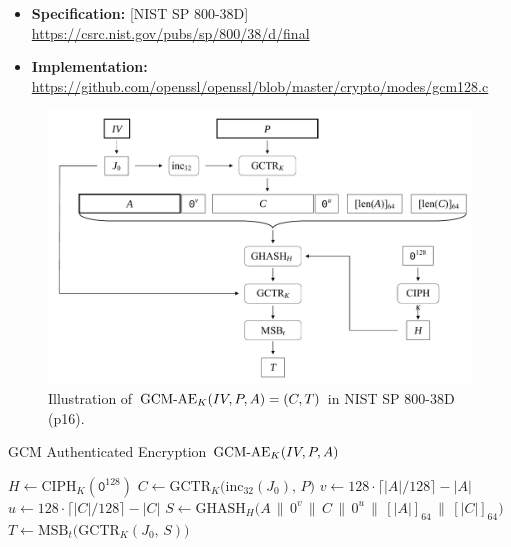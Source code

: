 \begin{itemize}
	\item \textbf{Specification:} [NIST SP 800-38D] \\
	\url{https://csrc.nist.gov/pubs/sp/800/38/d/final}
	\item \textbf{Implementation:} \\
	\url{https://github.com/openssl/openssl/blob/master/crypto/modes/gcm128.c}
\end{itemize}
\begin{figure}[h!]\centering
\includegraphics[scale=.325]{images/mode-gcm}
\caption{Illustration of ${\rm GCM}\text{-}{\rm AE}_K (IV, P, A) = (C, T)$ in NIST SP 800-38D (p16).}
\end{figure}

\begin{algorithm}[H]
	\caption{GCM Authenticated Encryption ${\rm GCM\text{-}AE}_K(IV,P,A)$}\label{alg:gcm-ae}
	$H \gets \mathrm{CIPH}_K(\texttt{0}^{128})$\;
	$C \gets \mathrm{GCTR}_K\bigl(\mathrm{inc}_{32}(J_0),\,P\bigr)$\;
	\BlankLine
	$v \gets 128\cdot\lceil|A|/128\rceil - |A|$\;
	$u \gets128\cdot\lceil|C|/128\rceil - |C|$\;
	$S \gets \mathrm{GHASH}_H\bigl(A\,\|\,0^v\,\|\,C\,\|\,0^u\,\|\,[\!|A|\!]_{64}\,\|\,[\!|C|\!]_{64}\bigr)$\;
	$T \gets \mathrm{MSB}_t\bigl(\mathrm{GCTR}_K(J_0,\,S)\bigr)$\;
	\;
\end{algorithm}

